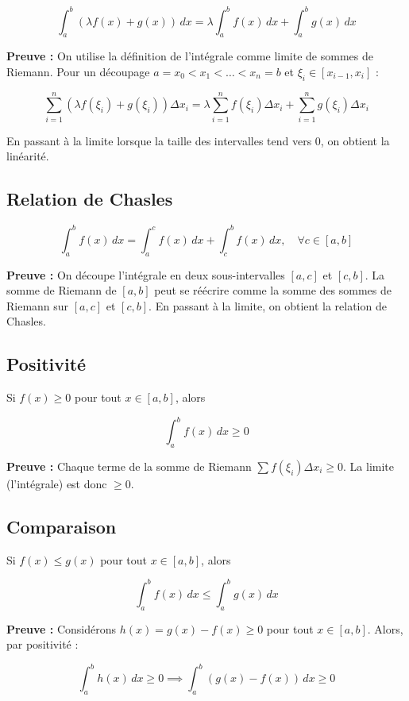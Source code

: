 \documentclass{report} %
\theoremstyle{definition}  %
\theoremstyle{plain} %
\theoremstyle{remark} %
\begin{document}
\[
\int_a^b (\lambda f(x) + g(x)) \, dx = \lambda \int_a^b f(x) \, dx + \int_a^b g(x) \, dx
\]

\noindent
\textbf{Preuve :}  
On utilise la définition de l'intégrale comme limite de sommes de Riemann. Pour un découpage \(a = x_0 < x_1 < \dots < x_n = b\) et \(\xi_i \in [x_{i-1},x_i]\) :

\[
\sum_{i=1}^{n} (\lambda f(\xi_i) + g(\xi_i)) \Delta x_i = \lambda \sum_{i=1}^{n} f(\xi_i) \Delta x_i + \sum_{i=1}^{n} g(\xi_i) \Delta x_i
\]

En passant à la limite lorsque la taille des intervalles tend vers 0, on obtient la linéarité.

\subsection{Relation de Chasles}

\[
\int_a^b f(x) \, dx = \int_a^c f(x) \, dx + \int_c^b f(x) \, dx, \quad \forall c \in [a,b]
\]

\noindent
\textbf{Preuve :}  
On découpe l’intégrale en deux sous-intervalles \([a,c]\) et \([c,b]\).  
La somme de Riemann de \([a,b]\) peut se réécrire comme la somme des sommes de Riemann sur \([a,c]\) et \([c,b]\).  
En passant à la limite, on obtient la relation de Chasles.

\subsection{Positivité}

Si \(f(x) \ge 0\) pour tout \(x \in [a,b]\), alors

\[
\int_a^b f(x) \, dx \ge 0
\]

\noindent
\textbf{Preuve :}  
Chaque terme de la somme de Riemann \(\sum f(\xi_i) \Delta x_i \ge 0\).  
La limite (l’intégrale) est donc \(\ge 0\).

\subsection{Comparaison}

Si \(f(x) \le g(x)\) pour tout \(x \in [a,b]\), alors

\[
\int_a^b f(x) \, dx \le \int_a^b g(x) \, dx
\]

\noindent
\textbf{Preuve :}  
Considérons \(h(x) = g(x) - f(x) \ge 0\) pour tout \(x \in [a,b]\).  
Alors, par positivité :

\[
\int_a^b h(x) \, dx \ge 0 \implies \int_a^b (g(x) - f(x)) \, dx \ge 0
\]
\end{document}
